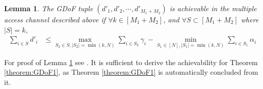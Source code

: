 \documentclass[11pt]{article}
\newtheorem{corollary}{Corollary}
\newtheorem{lemma}{Lemma}
\begin{document}
 
\begin{lemma}\label{lemma:mac} The GDoF tuple $(d'_1, d'_2, \cdots, d'_{M_1+M_2})$ is achievable in the multiple access channel described above if $\forall k\in[M_1+M_2]$, and $\forall S\subset[M_1+M_2]$ where $|S|=k$,
\begin{align}
\sum_{i\in S} d'_i
&\le\max_{S_2\in S,|S_2|=\min(k,N)}\sum_{i\in S_2} \gamma_i -\min_{S_1\in[N],|S_1|=\min(k,N)}\sum_{i\in S_1} \alpha_i \label{mac3}
\end{align}
\end{lemma} 
For proof of Lemma \ref{lemma:mac} see \cite{Arash_Jafar_MIMOsym_ArXiv}. It is sufficient to derive the achievability for Theorem \ref{theorem:GDoF1}, as Theorem \ref{theorem:GDoF1} is automatically concluded from it.
\end{document}
